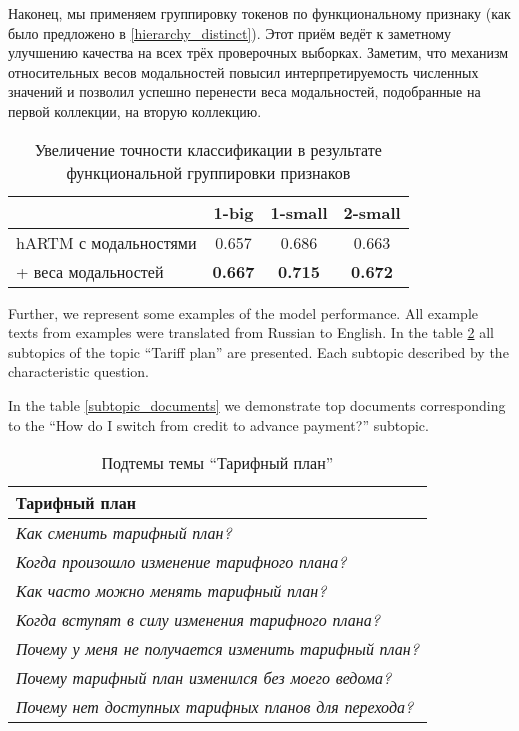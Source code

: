 Наконец, мы применяем группировку токенов по функциональному признаку (как было предложено в \ref{hierarchy_distinct}). Этот приём ведёт к заметному улучшению качества на всех трёх проверочных выборках. Заметим, что механизм относительных весов модальностей повысил интерпретируемость численных значений и позволил успешно перенести веса модальностей, подобранные на первой коллекции, на вторую коллекцию.

\begin{table}[!h]
    \centering
\begin{tabular}{p{3.7cm}|c|c|c}
    \hline
    & 1-big            & 1-small            & 2-small            \\ \hline
    hARTM с модальностями         & 0.657          & 0.686          & 0.663          \\
    + веса модальностей & \textbf{0.667} & \textbf{0.715} & \textbf{0.672} \\ \hline
\end{tabular}
    \caption{Увеличение точности классификации в результате функциональной группировки признаков}
    \label{results}
\end{table}

Further, we represent some examples of the model performance. All example texts from examples were translated from Russian to English. In the table \ref{topic_subtopic} all subtopics of the topic ``Tariff plan'' are presented. Each subtopic described by the characteristic question. 

In the table \ref{subtopic_documents} we demonstrate top documents corresponding to the ``How do I switch from credit to advance payment?'' subtopic.

\begin{table}[!h]
\begin{tabular}{p{7cm}}
  \hline
  \textbf{Тарифный план} \\
  \hline
  \textsl{Как сменить тарифный план?} \\
  \textsl{Когда произошло изменение тарифного плана?} \\
  \textsl{Как часто можно менять тарифный план?} \\
  \textsl{Когда вступят в силу изменения тарифного плана?} \\
  \textsl{Почему у меня не получается изменить тарифный план?} \\
  \textsl{Почему тарифный план изменился без моего ведома?} \\
  \textsl{Почему нет доступных тарифных планов для перехода?} \\
  \hline
\end{tabular}
\caption{Подтемы темы ``Тарифный план''}
\label{topic_subtopic}
\end{table}


